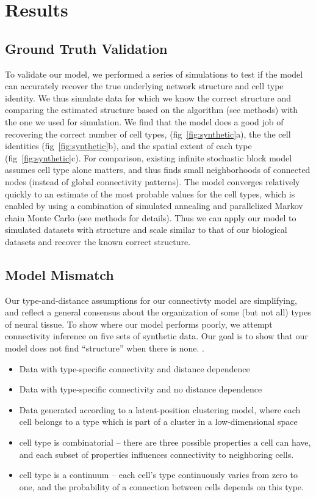 \documentclass{article}
\begin{document}
\section*{Results}


\subsection{Ground Truth Validation}
To validate our model, we performed a series of simulations to test if
the model can accurately recover the true underlying network structure
and cell type identity.  We thus simulate data for which we know the
correct structure and comparing the estimated structure based on the
algorithm (see methods) with the one we used for simulation. We find
that the model does a good job of recovering the correct number of
cell types, (fig~\ref{fig:synthetic}a), the the cell identities
(fig~\ref{fig:synthetic}b), and the spatial extent of each type
(fig~\ref{fig:synthetic}c).  For comparison, existing infinite
stochastic block model assumes cell type alone matters, and thus finds
small neighborhoods of connected nodes (instead of global connectivity
patterns). The model converges relatively quickly to an estimate of
the most probable values for the cell types, which is enabled by using
a combination of simulated annealing and parallelized Markov chain
Monte Carlo (see methods for details). Thus we can apply our model to
simulated datasets with structure and scale similar to that of our
biological datasets and recover the known correct structure.

\subsection{Model Mismatch}
Our type-and-distance assumptions for our connectivty model are
simplifying, and reflect a general consensus about the organization of
some (but not all) types of neural tissue. To show where our model
performs poorly, we attempt connectivity inference on five sets of
synthetic data. Our goal is to show that our model does not find
``structure'' when there is none. . 

\begin{itemize}
\item Data with type-specific connectivity and distance dependence
\item Data with type-specific connectivity and no distance dependence
\item Data generated according to a latent-position clustering model,
  where each cell belongs to a type which is part of a cluster in a
  low-dimensional space 
\item cell type is combinatorial -- there are three possible
  properties a cell can have, and each subset of properties influences
  connectivity to neighboring cells. 
\item cell type is a continuum -- each cell's type continuously varies
  from zero to one, and the probability of a connection between cells
  depends on this type.
\end{itemize}
\end{document}
